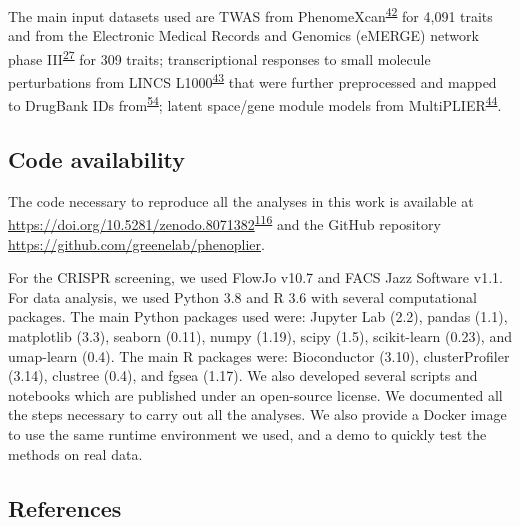 \documentclass[
  a4paper,
]{article}
\begin{document}
The main input datasets used are TWAS from PhenomeXcan\textsuperscript{\protect\hyperlink{ref-lY5ln3dB}{42}} for 4,091 traits and from the Electronic Medical Records and Genomics (eMERGE) network phase III\textsuperscript{\protect\hyperlink{ref-gZAOkumx}{27}} for 309 traits;
transcriptional responses to small molecule perturbations from LINCS L1000\textsuperscript{\protect\hyperlink{ref-F7lIlh2N}{43}} that were further preprocessed and mapped to DrugBank IDs from\textsuperscript{\protect\hyperlink{ref-1DJZvtwP1}{54}};
latent space/gene module models from MultiPLIER\textsuperscript{\protect\hyperlink{ref-14rnBunuZ}{44}}.

\hypertarget{code-availability}{%
\subsection{Code availability}\label{code-availability}}

The code necessary to reproduce all the analyses in this work is available at \url{https://doi.org/10.5281/zenodo.8071382}\textsuperscript{\protect\hyperlink{ref-cygmsEBt}{116}} and the GitHub repository \url{https://github.com/greenelab/phenoplier}.

For the CRISPR screening, we used FlowJo v10.7 and FACS Jazz Software v1.1.
For data analysis, we used Python 3.8 and R 3.6 with several computational packages.
The main Python packages used were: Jupyter Lab (2.2), pandas (1.1), matplotlib (3.3), seaborn (0.11), numpy (1.19), scipy (1.5), scikit-learn (0.23), and umap-learn (0.4).
The main R packages were: Bioconductor (3.10), clusterProfiler (3.14), clustree (0.4), and fgsea (1.17).
We also developed several scripts and notebooks which are published under an open-source license.
We documented all the steps necessary to carry out all the analyses.
We also provide a Docker image to use the same runtime environment we used, and a demo to quickly test the methods on real data.

\hypertarget{references}{%
\subsection{References}\label{references}}
\end{document}
